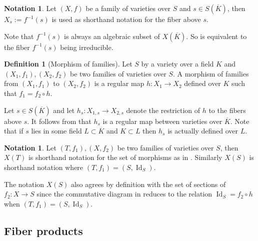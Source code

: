 \documentclass[a4paper,12pt,reqno]{amsart}
\DeclareMathOperator{\id}{Id}
\theoremstyle{definition}
\newtheorem{definition}[lemma]{Definition}
\newtheorem{notation}[lemma]{Notation}
\numberwithin{lemma}{section}
\numberwithin{equation}{section}
\numberwithin{figure}{section}
\begin{document}
\begin{notation}\label{def:fiber-notation}
Let $(X,f)$ be a family of varieties over $S$ and $s \in S(\overline K)$, then $X_s :=f^{-1}(s)$ is used as shorthand notation for the fiber above $s$.
\end{notation}
Note that $f^{-1}(s)$ is always an algebraic subset of $X(\overline K)$. So  is equivalent to the fiber $f^{-1}(s)$ being irreducible.

\begin{definition}[Morphism of families]\label{def:family-of-varieties-morphism}
Let $S$ by a variety over a field $K$ and $(X_1,f_1), (X_2,f_2)$ be two families of varieties over $S$. A morphism of families from $(X_1,f_1)$ to $(X_2,f_2)$ is a regular map $h: X_1 \to X_2$ defined over $K$ such that $f_1 = f_2 \circ h$.
\begin{center}
\end{center}
\end{definition}

Let $s \in  S(\overline K)$ and let $h_s : X_{1,s} \to X_{2,s}$  denote the restriction of $h$ to the fibers above $s$. It follows from  that $h_s$ is a regular map between varieties over $\overline K$. Note that if $s$ lies in some field $L \subset \overline K$ and $K \subset L$ then $h_s$ is actually defined over $L.$

\begin{notation}
	Let $(T,f_1), (X,f_2)$ be two families of varieties over $S$, then $X(T)$ is shorthand notation for the set of morphisms as in . Similarly $X(S)$ is shorthand notation where $(T,f_1) = (S, \id_S)$. 
\end{notation}
The notation $X(S)$ also agrees by definition with the set of sections of $f_2 : X \to S$ since the commutative diagram in  reduces to the relation $\id_S = f_2 \circ h$ when $(T,f_1) = (S, \id_S)$.

\subsection{Fiber products}
\end{document}
